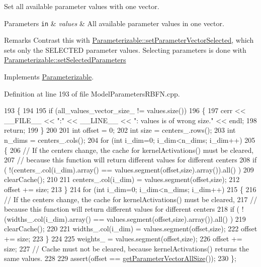 Set all available parameter values with one vector. 


\begin{DoxyParams}[1]{Parameters}
\mbox{\tt in}  & {\em values} & All available parameter values in one vector. \\
\hline
\end{DoxyParams}
\begin{DoxyRemark}{Remarks}
Contrast this with \hyperlink{classDmpBbo_1_1Parameterizable_aee501e63a46d63eb58a6f271bf093b9d}{Parameterizable\+::set\+Parameter\+Vector\+Selected}, which sets only the S\+E\+L\+E\+C\+T\+E\+D parameter values. Selecting parameters is done with \hyperlink{classDmpBbo_1_1Parameterizable_a8a976b5db2d1809ece10e431816f0f27}{Parameterizable\+::set\+Selected\+Parameters} 
\end{DoxyRemark}


Implements \hyperlink{classDmpBbo_1_1Parameterizable_acef2ee975b497baf60b1f38da2b65f0d}{Parameterizable}.



Definition at line 193 of file Model\+Parameters\+R\+B\+F\+N.\+cpp.


\begin{DoxyCode}
193                                                                       \{
194 
195   \textcolor{keywordflow}{if} (all\_values\_vector\_size\_ != values.size())
196   \{
197     cerr << \_\_FILE\_\_ << \textcolor{stringliteral}{":"} << \_\_LINE\_\_ << \textcolor{stringliteral}{": values is of wrong size."} << endl;
198     \textcolor{keywordflow}{return};
199   \}
200   
201   \textcolor{keywordtype}{int} offset = 0;
202   \textcolor{keywordtype}{int} size = centers\_.rows();
203   \textcolor{keywordtype}{int} n\_dims = centers\_.cols();
204   \textcolor{keywordflow}{for} (\textcolor{keywordtype}{int} i\_dim=0; i\_dim<n\_dims; i\_dim++)
205   \{
206     \textcolor{comment}{// If the centers change, the cache for kernelActivations() must be cleared,}
207     \textcolor{comment}{// because this function will return different values for different centers}
208     \textcolor{keywordflow}{if} ( !(centers\_.col(i\_dim).array() == values.segment(offset,size).array()).all() )
209       clearCache();
210     
211     centers\_.col(i\_dim) = values.segment(offset,size);
212     offset += size;
213   \}
214   \textcolor{keywordflow}{for} (\textcolor{keywordtype}{int} i\_dim=0; i\_dim<n\_dims; i\_dim++)
215   \{
216     \textcolor{comment}{// If the centers change, the cache for kernelActivations() must be cleared,}
217     \textcolor{comment}{// because this function will return different values for different centers}
218     \textcolor{keywordflow}{if} ( !(widths\_.col(i\_dim).array() == values.segment(offset,size).array()).all() )
219       clearCache();
220     
221     widths\_.col(i\_dim) = values.segment(offset,size);
222     offset += size;
223   \}
224 
225   weights\_ = values.segment(offset,size);
226   offset += size;
227   \textcolor{comment}{// Cache must not be cleared, because kernelActivations() returns the same values.}
228 
229   assert(offset == \hyperlink{classDmpBbo_1_1ModelParametersRBFN_ab24d2485b3b795b516f4844f225100eb}{getParameterVectorAllSize}());   
230 \};
\end{DoxyCode}


